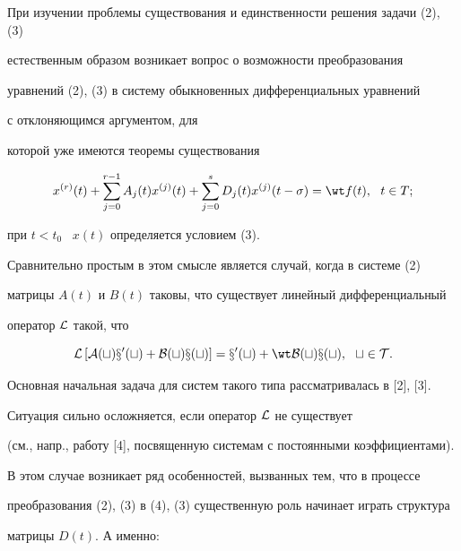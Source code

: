 При изучении проблемы существования и единственности решения задачи (2), (3)


естественным образом возникает вопрос о возможности преобразования


уравнений (2), (3) в систему обыкновенных дифференциальных уравнений


с отклоняющимся аргументом, для


которой уже имеются теоремы существования


\begin{equation}


x^{(r)}(t)+ \sum_{j=0}^{r-1}{A_j(t)x^{(j)}(t)}+


\sum_{j=0}^{s}{D_j(t)x^{(j)}(t-\sigma)}= \wt f(t), \ \ t \in T;


\end{equation}


при $t < t_0$ \ $x(t)$ определяется условием (3).


Сравнительно простым в этом смысле является случай, когда в системе (2)


матрицы $A(t)$ и $B(t)$ таковы, что существует линейный дифференциальный


оператор $\cal L$ такой, что


\begin{equation}


\cal L \left[ A(t)x'(t)+B(t)x(t) \right] =x'(t)+ \wt B(t)x(t),\ \ t \in T.


\end{equation}


Основная начальная задача для систем такого типа рассматривалась в [2], [3].


Ситуация сильно осложняется, если оператор $\cal L$ не существует


(см., напр., работу [4], посвященную системам с постоянными коэффициентами).


В этом случае возникает ряд особенностей, вызванных тем, что в процессе


преобразования (2), (3) в (4), (3) существенную роль начинает играть структура


матрицы $D(t)$. А именно:


